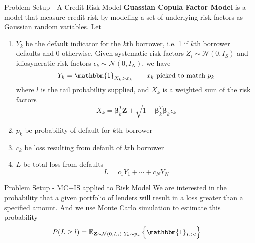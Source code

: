 \documentclass{beamer}
\newcommand{\matr}[1]{\mathbf{#1}}
\newcommand{\E}[2][]{\mathbb{E}_{#1}\left\{#2\right\}}
\newcommand{\normal}[1]{\mathcal{N}\left(#1\right)}
\newcommand{\bZ}{\matr{Z}}
\begin{document}
\begin{frame}{Problem Setup - A Credit Risk Model}
\textbf{Guassian Copula Factor Model} is a model that measure credit risk by modeling a set of underlying risk factors as Gaussian random variables. Let 
\begin{enumerate}
    \item $Y_k$ be the default indicator for the $k$th borrower, i.e. 1 if $k$th borrower defaults and 0 otherwise. Given systematic risk factors $Z_i \sim \normal{0,I_S}$ and idiosyncratic risk factors $\epsilon_k \sim \normal{0,I_N}$, we have
    \[
        Y_k = \mathbbm{1}_{X_k > x_k} \qquad \text{$x_k$ picked to match $p_k$}
    \]
    where $l$ is the tail probability supplied, and $X_k$ is a weighted sum of the risk factors
    \[
        X_k = \boldsymbol{\beta}_k^T \matr{Z}  + \sqrt{1 - \boldsymbol{\beta}_k^T \boldsymbol{\beta}_k} \epsilon_k
    \]
    \item $p_k$ be probability of default for $k$th borrower
    \item $c_k$ be loss resulting from default of $k$th borrower 
    \item $L$ be total loss from defaults
    \[
        L = c_1 Y_1 + \cdots + c_N Y_N    
    \]
\end{enumerate}
\end{frame}


\begin{frame}{Problem Setup - MC+IS applied to Risk Model}
We are interested in the probability that a given portfolio of lenders will result in a loss greater than a specified amount. And we use Monte Carlo simulation to estimate this probability
\begin{align*}
    P(L \geq l) 
    &= \E[\bZ \sim \normal{0, I_S}\,\, Y_k \sim p_k]{\mathbbm{1}_{L \geq l}}
\end{align*}
\end{frame}




\end{document}
